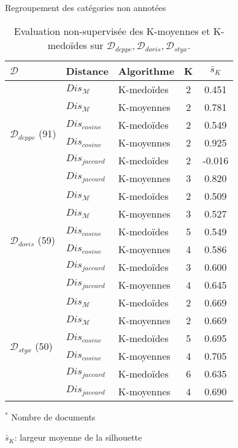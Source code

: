 \begin{frame}[c]{Regroupement des catégories non annotées}
	\newlength{\mrcell}
	\setlength{\mrcell}{0.8cm}\tiny
	\begin{table}[!htb]
		\tiny
		\begin{center}						
				\begin{tabular}[pos]{|l|l|l|c|c|}
					\hline
					$\mathcal{D}$& {Distance} & {Algorithme}& {K}  & $\bar{s}_K$ \\ \hline
					\multirow{6}{\mrcell}{$\mathcal{D}_{dcppc}$ (91)} & $Dis_\mathcal{M}$ & K-medoïdes & 2 & 0.451  \\ \cline{2-5}
					& $Dis_\mathcal{M}$  & K-moyennes & 2 & 0.781  \\ \cline{2-5}
					& $Dis_{cosine}$ & K-medoïdes & 2 & 0.549 \\ \cline{2-5}
					& $Dis_{cosine}$ & K-moyennes & 2 & 0.925 \\ \cline{2-5}
					& $Dis_{jaccard}$ & K-medoïdes & 2 & -0.016  \\ \cline{2-5}
					& $Dis_{jaccard}$ & K-moyennes & 3 & 0.820 \\ \hline
					\multirow{6}{\mrcell}{$\mathcal{D}_{doris}$ (59)}  & $Dis_\mathcal{M}$ & K-medoïdes & 2 & 0.509  \\ \cline{2-5}
					& $Dis_\mathcal{M}$ & K-moyennes & 3 & 0.527  \\ \cline{2-5}
					& $Dis_{cosine}$ & K-medoïdes & 5 & 0.549 \\ \cline{2-5}
					& $Dis_{cosine}$ & K-moyennes & 4 & 0.586 \\ \cline{2-5}
					& $Dis_{jaccard}$ & K-medoïdes & 3 & 0.600 \\ \cline{2-5}
					& $Dis_{jaccard}$ & K-moyennes & 4 & 0.645 
					\\ \hline
					\multirow{6}{\mrcell}{$\mathcal{D}_{styx}$ (50)}  & $Dis_\mathcal{M}$ & K-medoïdes & 2 & 0.669 \\ \cline{2-5}
					& $Dis_\mathcal{M}$ & K-moyennes & 2 & 0.669 \\ \cline{2-5}
					& $Dis_{cosine}$ & K-medoïdes & 5 & 0.695 \\ \cline{2-5}
					& $Dis_{cosine}$ & K-moyennes & 4 & 0.705 \\ \cline{2-5}
					& $Dis_{jaccard}$ & K-medoïdes & 6 & 0.635 \\ \cline{2-5}
					& $Dis_{jaccard}$  & K-moyennes & 4 & 0.690 \\ \hline
				\end{tabular}
		\end{center}
		
		$^*$ Nombre de documents
		
		$\bar{s}_K$: largeur moyenne de la silhouette
		
		\caption{Evaluation non-supervisée des K-moyennes et K-medoïdes sur $\mathcal{D}_{dcppc}, \mathcal{D}_{doris}, \mathcal{D}_{styx}$.} \label{tab:similarite:validation-nonsupervisee}
	\end{table}
\end{frame}

